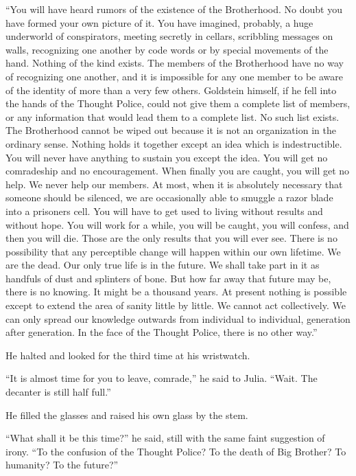 ``You will have heard rumors of the existence of the Brotherhood. No
doubt you have formed your own picture of it. You have imagined,
probably, a huge underworld of conspirators, meeting secretly in
cellars, scribbling messages on walls, recognizing one another by code
words or by special movements of the hand. Nothing of the kind exists.
The members of the Brotherhood have no way of recognizing one another,
and it is impossible for any one member to be aware of the identity of
more than a very few others. Goldstein himself, if he fell into the
hands of the Thought Police, could not give them a complete list of
members, or any information that would lead them to a complete list. No
such list exists. The Brotherhood cannot be wiped out because it is not
an organization in the ordinary sense. Nothing holds it together except
an idea which is indestructible. You will never have anything to sustain
you except the idea. You will get no comradeship and no encouragement.
When finally you are caught, you will get no help. We never help our
members. At most, when it is absolutely necessary that someone should be
silenced, we are occasionally able to smuggle a razor blade into a
prisoner\textquotesingle s cell. You will have to get used to living
without results and without hope. You will work for a while, you will be
caught, you will confess, and then you will die. Those are the only
results that you will ever see. There is no possibility that any
perceptible change will happen within our own lifetime. We are the dead.
Our only true life is in the future. We shall take part in it as
handfuls of dust and splinters of bone. But how far away that future may
be, there is no knowing. It might be a thousand years. At present
nothing is possible except to extend the area of sanity little by
little. We cannot act collectively. We can only spread our knowledge
outwards from individual to individual, generation after generation. In
the face of the Thought Police, there is no other way.''

He halted and looked for the third time at his wristwatch.

``It is almost time for you to leave, comrade,'' he said to Julia. ``Wait.
The decanter is still half full.''

He filled the glasses and raised his own glass by the stem.

``What shall it be this time?'' he said, still with the same faint
suggestion of irony. ``To the confusion of the Thought Police? To the
death of Big Brother? To humanity? To the future?''

